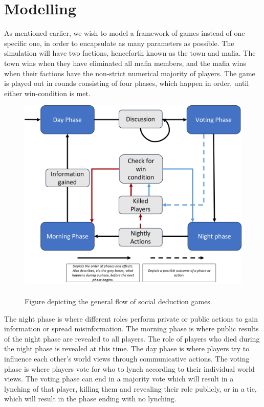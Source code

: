 \section{Modelling}
As mentioned earlier, we wish to model a framework of games instead of one
specific one, in order to encapsulate as many parameters as possible. The
simulation will have two factions, henceforth known as the town and mafia. The
town wins when they have eliminated all mafia members, and the mafia wins when
their factions have the non-strict numerical majority of players. The game is
played out in rounds consisting of four phases, which happen in order, until
either win-condition is met.
\begin{figure}[H]
	\includegraphics[width=1\linewidth]{figures/Gameoverview}
	\caption{\\Figure depicting the general flow of social deduction games.}
	\label{fig:GameOverview}
\end{figure}

The night phase is where different roles perform private or public actions to
gain information or spread misinformation. The morning phase is where public
results of the night phase are revealed to all players. The role of players who
died during the night phase is revealed at this time. The day phase is where
players try to influence each other's world views through communicative
actions. The voting phase is where players vote for who to lynch according to
their individual world views. The voting phase can end in a majority vote which
will result in a lynching of that player, killing them and revealing their role
publicly, or in a tie, which will result in the phase ending with no lynching.

